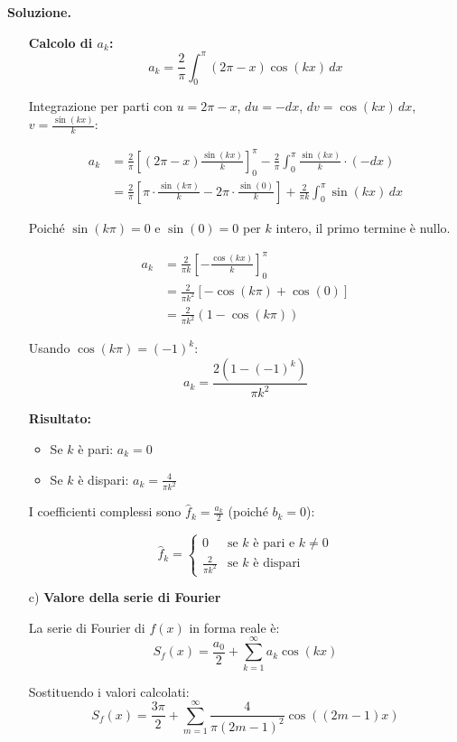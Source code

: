 \documentclass[12pt, a4paper]{article}
\newenvironment{solution}{%
    \par\noindent\textbf{Soluzione.}\medskip\par
    \normalfont
}{\par\bigskip}
\begin{document}
\begin{solution}
\begin{enumerate}
    \textbf{Calcolo di $a_k$:}
    \[a_k = \frac{2}{\pi} \int_{0}^{\pi} (2\pi-x) \cos(kx) \, dx\]
    
    Integrazione per parti con $u = 2\pi-x$, $du = -dx$, $dv = \cos(kx) \, dx$, $v = \frac{\sin(kx)}{k}$:
    
    \begin{align}
        a_k &= \frac{2}{\pi} \left[ (2\pi-x)\frac{\sin(kx)}{k} \right]_0^{\pi} - \frac{2}{\pi} \int_{0}^{\pi} \frac{\sin(kx)}{k} \cdot (-dx) \\
        &= \frac{2}{\pi} \left[ \pi \cdot \frac{\sin(k\pi)}{k} - 2\pi \cdot \frac{\sin(0)}{k} \right] + \frac{2}{\pi k} \int_{0}^{\pi} \sin(kx) \, dx
    \end{align}
    
    Poiché $\sin(k\pi) = 0$ e $\sin(0) = 0$ per $k$ intero, il primo termine è nullo.
    
    \begin{align}
        a_k &= \frac{2}{\pi k} \left[ -\frac{\cos(kx)}{k} \right]_0^{\pi} \\
        &= \frac{2}{\pi k^2} \left[ -\cos(k\pi) + \cos(0) \right] \\
        &= \frac{2}{\pi k^2} (1 - \cos(k\pi))
    \end{align}
    
    Usando $\cos(k\pi) = (-1)^k$:
    \[a_k = \frac{2(1-(-1)^k)}{\pi k^2}\]
    
    \textbf{Risultato:}
    \begin{itemize}
        \item Se $k$ è pari: $a_k = 0$
        \item Se $k$ è dispari: $a_k = \frac{4}{\pi k^2}$
    \end{itemize}
    
    I coefficienti complessi sono $\hat{f}_k = \frac{a_k}{2}$ (poiché $b_k = 0$):
    
    \[\hat{f}_k = \begin{cases}
        0 & \text{se } k \text{ è pari e } k \neq 0 \\
        \frac{2}{\pi k^2} & \text{se } k \text{ è dispari}
    \end{cases}\]

    \item[c)] \textbf{Valore della serie di Fourier}
    
    La serie di Fourier di $f(x)$ in forma reale è:
    \[S_f(x) = \frac{a_0}{2} + \sum_{k=1}^{\infty} a_k \cos(kx)\]
    
    Sostituendo i valori calcolati:
    \[S_f(x) = \frac{3\pi}{2} + \sum_{m=1}^{\infty} \frac{4}{\pi (2m-1)^2} \cos((2m-1)x)\]
    

\end{enumerate}
\end{solution}
\end{document}

